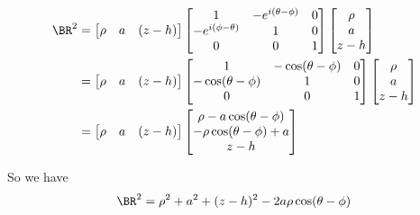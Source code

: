 \begin{align*}
\BR^2 
&=
\begin{bmatrix}
\rho &
a & 
(z - h)
\end{bmatrix}
\begin{bmatrix}
1 & - e^{i(\theta-\phi)} & 0 \\
- e^{i(\phi -\theta)} & 1 & 0 \\
0 & 0 & 1 \\
\end{bmatrix}
\begin{bmatrix}
\rho \\
a \\
z - h
\end{bmatrix} \\
&=
\begin{bmatrix}
\rho &
a & 
(z - h)
\end{bmatrix}
\begin{bmatrix}
1 & - \cos(\theta-\phi) & 0 \\
- \cos(\theta -\phi) & 1 & 0 \\
0 & 0 & 1 \\
\end{bmatrix}
\begin{bmatrix}
\rho \\
a \\
z - h
\end{bmatrix} \\
&=
\begin{bmatrix}
\rho &
a & 
(z - h)
\end{bmatrix}
\begin{bmatrix}
\rho - a \cos(\theta - \phi) \\
- \rho \cos(\theta - \phi) + a \\
z - h
\end{bmatrix}
\end{align*}

So we have
\begin{equation}\label{eqn:matrixVectorPotentials:n}
\BR^2 = \rho^2 + a^2 + (z -h)^2 - 2 a \rho \cos(\theta - \phi)
\end{equation}

\EndArticle
